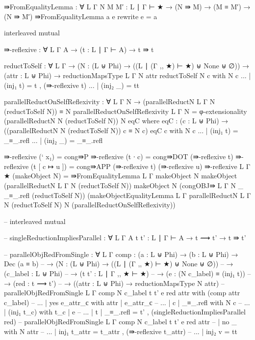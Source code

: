 {\begin{code}
⇛FromEqualityLemma : ∀ {L Γ} {N M M′ : L ∣ Γ ⊢ ★} → (N ⇛ M) → (M ≡ M′) → (N ⇛ M′)
⇛FromEqualityLemma a e rewrite e = a

interleaved mutual

  ⇛-reflexive : ∀ {L Γ A} → (t : L ∣ Γ ⊢ A) → t ⇛ t

  reductToSelf : ∀ {L Γ} → (N : (L ⊎ Phi) → ((L ∣ (Γ ,, ★) ⊢ ★) ⊎ None ⊎ ∅)) → (attr : L ⊎ Phi) → reductionMapsType {L} {Γ} N attr
  reductToSelf N c with N c
  ... | (inj₁ t) = t , (⇛-reflexive t)
  ... | (inj₂ _) = tt

  parallelReductOnSelfReflexivity : ∀ {L Γ N} → (parallelReductN {L} {Γ} N (reductToSelf N)) ≡ N
  parallelReductOnSelfReflexivity {L} {Γ} {N} = φ-extensionality (parallelReductN N (reductToSelf N)) N eqC where
    eqC : (c : L ⊎ Phi) → ((parallelReductN N (reductToSelf N)) c ≡ N c)
    eqC c with N c
    ... | (inj₁ t) = _≡_.refl
    ... | (inj₂ _) = _≡_.refl

  ⇛-reflexive (` x₁) = cong⇛P
  ⇛-reflexive (t ∙ c) = cong⇛DOT (⇛-reflexive t)
  ⇛-reflexive (t [ c ↦ u ]) = cong⇛APP (⇛-reflexive t) (⇛-reflexive u)
  ⇛-reflexive {L} {Γ} {★} (makeObject N) = 
    ⇛FromEqualityLemma {L} {Γ}
      {makeObject N}
      {makeObject (parallelReductN {L} {Γ} N (reductToSelf N))}
      {makeObject N}
      (congOBJ⇛ {L} {Γ} {N} {_} {_≡_.refl} (reductToSelf N))
      (makeObjectEqualityLemma {L} {Γ} {parallelReductN {L} {Γ} N (reductToSelf N)} {N} (parallelReductOnSelfReflexivity))

-- interleaved mutual

  -- singleReductionImpliesParallel : ∀ {L Γ A} {t t' : L ∣ Γ ⊢ A} → t ⟿ t' → t ⇛ t'

  -- parallelObjRedFromSingle : ∀ {L Γ} {comp : (a : L ⊎ Phi) → (b : L ⊎ Phi) → Dec (a ≡ b)}
  --   → (N : (L ⊎ Phi) → ((L ∣ (Γ ,, ★) ⊢ ★) ⊎ None ⊎ ∅)) 
  --   → (c_label : L ⊎ Phi) 
  --   → (t t' : L ∣ Γ ,, ★ ⊢ ★) 
  --   → (e : (N c_label) ≡ (inj₁ t)) 
  --   → (red : t ⟿ t') 
  --   → ((attr : L ⊎ Phi) → reductionMapsType N attr)
  -- parallelObjRedFromSingle {L} {Γ} {comp} N c_label t t' e red attr with (comp attr c_label)
  -- ... | yes e_attr_с with attr | e_attr_с
  -- ...   | c | _≡_.refl with N c
  -- ...     | (inj₁ t_c) with t_c | e
  -- ...       | t | _≡_.refl = t' , (singleReductionImpliesParallel red)
  -- parallelObjRedFromSingle {L} {Γ} {comp} N c_label t t' e red attr
  --     | no _ with N attr
  -- ...   | inj₁ t_attr = t_attr , (⇛-reflexive t_attr)
  -- ...   | inj₂ v = tt



\end{code}}
